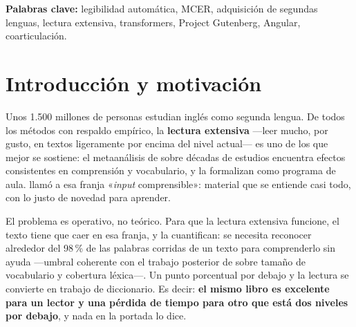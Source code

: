 \documentclass[11pt,a4paper]{article}
\newcommand{\pct}{\,\%}
\begin{document}
\vspace{0.4cm}
\noindent\textbf{Palabras clave:} legibilidad automática, MCER, adquisición de
segundas lenguas, lectura extensiva, transformers, Project Gutenberg, Angular, coarticulación.

\vspace{0.8cm}
\noindent{}

\clearpage
\tableofcontents
\clearpage
\listoffigures
\clearpage

\section{Introducción y motivación}

Unos 1.500 millones de personas estudian inglés como segunda lengua. De todos los
métodos con respaldo empírico, la \textbf{lectura extensiva} —leer mucho, por gusto, en
textos ligeramente por encima del nivel actual— es uno de los que mejor se sostiene: el
metaanálisis de \textcite{nakanishi2015meta} sobre décadas de estudios encuentra
efectos consistentes en comprensión y vocabulario, y \textcite{day1998extensive} la
formalizan como programa de aula. \textcite{krashen1985input} llamó a esa franja
«\emph{input} comprensible»: material que se entiende casi todo, con lo justo de
novedad para aprender.

El problema es operativo, no teórico. Para que la lectura extensiva funcione, el texto
tiene que caer en esa franja, y \textcite{hu2000unknown} la cuantifican: se necesita
reconocer alrededor del 98\pct{} de las palabras corridas de un texto para comprenderlo
sin ayuda —umbral coherente con el trabajo posterior de \textcite{nation2013learning}
sobre tamaño de vocabulario y cobertura léxica—. Un punto porcentual por debajo y la
lectura se convierte en trabajo de diccionario. Es decir: \textbf{el mismo libro es
excelente para un lector y una pérdida de tiempo para otro que está dos niveles por
debajo}, y nada en la portada lo dice.
\end{document}

